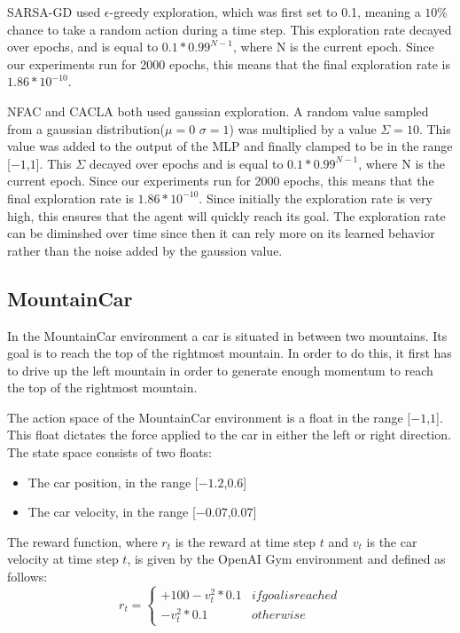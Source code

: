 SARSA-GD used $\epsilon$-greedy exploration, which was first set to 0.1, meaning a $10\%$ chance to take a random action during a time step. This exploration rate decayed over epochs, and is equal to $0.1 * 0.99^{N-1}$, where N is the current epoch. Since our experiments run for 2000 epochs, this means that the final exploration rate is $1.86*10^{-10}$.   

NFAC and CACLA both used gaussian exploration.  A random value sampled from a gaussian distribution($\mu=0$ $\sigma=1$) was multiplied by a value $\Sigma=10$. This value was added to the output of the MLP and finally clamped to be in the range [$-1$,$1$]. This $\Sigma$ decayed over epochs and is equal to  $0.1 * 0.99^{N-1}$, where N is the current epoch. Since our experiments run for 2000 epochs, this means that the final exploration rate is $1.86*10^{-10}$. Since initially the exploration rate is very high, this ensures that the agent will quickly reach its goal. The exploration rate can be diminshed over time since then it can rely more on its learned behavior rather than the noise added by the gaussion value. 

\subsection{MountainCar}
In the MountainCar environment a car is situated in between two mountains. Its goal is to reach the top of the rightmost mountain. In order to do this, it first has to drive up the left mountain in order to generate enough momentum to reach the top of the rightmost mountain. 

The action space of the MountainCar environment is a float in the range [$-1$,$1$]. This float dictates the force applied to the car in either the left or right direction. The state space consists of two floats:
\begin{itemize}
    \item[] The car position, in the range [$-1.2$,$0.6$]
    \item[] The car velocity, in the range [$-0.07$,$0.07$]
\end{itemize}

The reward function, where $r_t$ is the reward at time step $t$ and $v_t$ is the car velocity at time step $t$, is given by the OpenAI Gym environment and defined as follows:
\begin{equation}
    r_t =
    \begin{cases*}
      +100 -v_t^2 * 0.1 & if goal is reached \\
      -v_t^2 * 0.1 & otherwise
    \end{cases*}
\end{equation}

